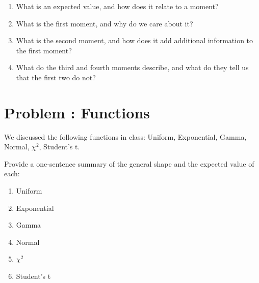 \documentclass[11pt]{article}
\newcounter{problem}
\newcommand{\problem}[1]{\stepcounter{problem}\section*{Problem \theproblem: #1}}
\begin{document}
\begin{enumerate}[label=\alph*.]
\item What is an expected value, and how does it relate to a moment?
\item What is the first moment, and why do we care about it?
\item What is the second moment, and how does it add additional
  information to the first moment?
\item What do the third and fourth moments describe, and what do they
  tell us that the first two do not?
\end{enumerate}

\problem{Functions}

We discussed the following functions in class: Uniform, Exponential,
Gamma, Normal, $\chi^2$, Student's t.

Provide a one-sentence summary of the general shape and the expected
value of each:

\begin{enumerate}[label=\alph*.]
\item Uniform
\item Exponential
\item Gamma
\item Normal
\item $\chi^2$
\item Student's t
\end{enumerate}


\end{document}
